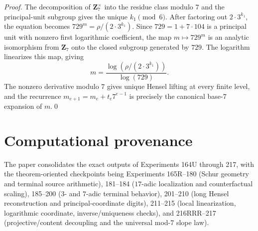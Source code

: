 \documentclass[11pt]{article}
\theoremstyle{definition}
\theoremstyle{remark}
\begin{document}
\begin{proof}
The decomposition of $\mathbf Z_7^\times$ into the residue class modulo $7$ and the principal-unit subgroup gives the unique $k_1\pmod6$. After factoring out $2\cdot3^{k_1}$, the equation becomes $729^m=\rho/(2\cdot3^{k_1})$. Since $729=1+7\cdot104$ is a principal unit with nonzero first logarithmic coefficient, the map $m\mapsto729^m$ is an analytic isomorphism from $\mathbf Z_7$ onto the closed subgroup generated by $729$. The logarithm linearizes this map, giving
\[
 m=\frac{\log(\rho/(2\cdot3^{k_1}))}{\log(729)}.
\]
The nonzero derivative modulo $7$ gives unique Hensel lifting at every finite level, and the recurrence $m_{e+1}=m_e+t_e7^{e-1}$ is precisely the canonical base-$7$ expansion of $m$.\qed\end{proof}

\section*{Computational provenance}
The paper consolidates the exact outputs of Experiments 164U through 217, with the theorem-oriented checkpoints being Experiments 165R--180 (Schur geometry and terminal source arithmetic), 181--184 ($17$-adic localization and counterfactual scaling), 185--200 ($3$- and $7$-adic terminal behavior), 201--210 (long Hensel reconstruction and principal-coordinate digits), 211--215 (local linearization, logarithmic coordinate, inverse/uniqueness checks), and 216RRR--217 (projective/content decoupling and the universal mod-$7$ slope law).
\end{document}
